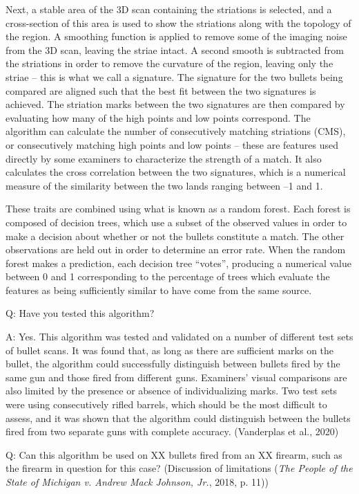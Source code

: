 \documentclass[print]{nuthesis}
\begin{document}
Next, a stable area of the 3D scan containing the striations is selected, and a cross-section of this area is used to show the striations along with the topology of the region.
A smoothing function is applied to remove some of the imaging noise from the 3D scan, leaving the striae intact.
A second smooth is subtracted from the striations in order to remove the curvature of the region, leaving only the striae -- this is what we call a signature.
The signature for the two bullets being compared are aligned such that the best fit between the two signatures is achieved.
The striation marks between the two signatures are then compared by evaluating how many of the high points and low points correspond.
The algorithm can calculate the number of consecutively matching striations (CMS), or consecutively matching high points and low points -- these are features used directly by some examiners to characterize the strength of a match.
It also calculates the cross correlation between the two signatures, which is a numerical measure of the similarity between the two lands ranging between --1 and 1.

These traits are combined using what is known as a random forest.
Each forest is composed of decision trees, which use a subset of the observed values in order to make a decision about whether or not the bullets constitute a match.
The other observations are held out in order to determine an error rate.
When the random forest makes a prediction, each decision tree ``votes'', producing a numerical value between 0 and 1 corresponding to the percentage of trees which evaluate the features as being sufficiently similar to have come from the same source.

Q: Have you tested this algorithm?

A: Yes.
This algorithm was tested and validated on a number of different test sets of bullet scans.
It was found that, as long as there are sufficient marks on the bullet, the algorithm could successfully distinguish between bullets fired by the same gun and those fired from different guns.
Examiners' visual comparisons are also limited by the presence or absence of individualizing marks.
Two test sets were using consecutively rifled barrels, which should be the most difficult to assess, and it was shown that the algorithm could distinguish between the bullets fired from two separate guns with complete accuracy. (Vanderplas et al., 2020)

Q: Can this algorithm be used on XX bullets fired from an XX firearm, such as the firearm in question for this case?
(Discussion of limitations (\emph{The {People} of the {State} of {Michigan} v. Andrew {Mack} {Johnson}, {Jr.}}, 2018, p. 11))
\end{document}
